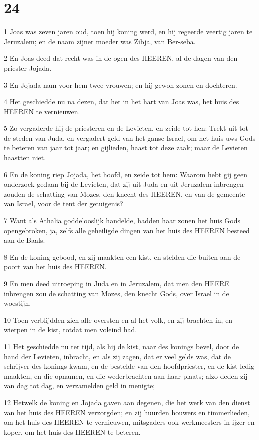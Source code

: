 \chapter{24}

\par 1 Joas was zeven jaren oud, toen hij koning werd, en hij regeerde veertig jaren te Jeruzalem; en de naam zijner moeder was Zibja, van Ber-seba.
\par 2 En Joas deed dat recht was in de ogen des HEEREN, al de dagen van den priester Jojada.
\par 3 En Jojada nam voor hem twee vrouwen; en hij gewon zonen en dochteren.
\par 4 Het geschiedde nu na dezen, dat het in het hart van Joas was, het huis des HEEREN te vernieuwen.
\par 5 Zo vergaderde hij de priesteren en de Levieten, en zeide tot hen: Trekt uit tot de steden van Juda, en vergadert geld van het ganse Israel, om het huis uws Gods te beteren van jaar tot jaar; en gijlieden, haast tot deze zaak; maar de Levieten haastten niet.
\par 6 En de koning riep Jojada, het hoofd, en zeide tot hem: Waarom hebt gij geen onderzoek gedaan bij de Levieten, dat zij uit Juda en uit Jeruzalem inbrengen zouden de schatting van Mozes, den knecht des HEEREN, en van de gemeente van Israel, voor de tent der getuigenis?
\par 7 Want als Athalia goddelooslijk handelde, hadden haar zonen het huis Gods opengebroken, ja, zelfs alle geheiligde dingen van het huis des HEEREN besteed aan de Baals.
\par 8 En de koning gebood, en zij maakten een kist, en stelden die buiten aan de poort van het huis des HEEREN.
\par 9 En men deed uitroeping in Juda en in Jeruzalem, dat men den HEERE inbrengen zou de schatting van Mozes, den knecht Gods, over Israel in de woestijn.
\par 10 Toen verblijdden zich alle oversten en al het volk, en zij brachten in, en wierpen in de kist, totdat men voleind had.
\par 11 Het geschiedde nu ter tijd, als hij de kist, naar des konings bevel, door de hand der Levieten, inbracht, en als zij zagen, dat er veel gelds was, dat de schrijver des konings kwam, en de bestelde van den hoofdpriester, en de kist ledig maakten, en die opnamen, en die wederbrachten aan haar plaats; alzo deden zij van dag tot dag, en verzamelden geld in menigte;
\par 12 Hetwelk de koning en Jojada gaven aan degenen, die het werk van den dienst van het huis des HEEREN verzorgden; en zij huurden houwers en timmerlieden, om het huis des HEEREN te vernieuwen, mitsgaders ook werkmeesters in ijzer en koper, om het huis des HEEREN te beteren.
